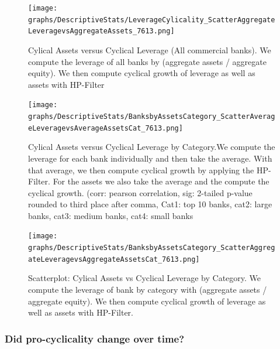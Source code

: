 \documentclass[12pt, a4paper]{article} %
\begin{document}
\begin{figure}[H]
\begin{minipage}{\textwidth}
\centering
\texttt{[image: graphs/DescriptiveStats/LeverageCylicality\_ScatterAggregateLeveragevsAggregateAssets\_7613.png]}
\label{fig:ScatterCyclicalAggregateLeverageAssets}
\caption[1]{Cylical Assets versus Cyclical Leverage (All commercial banks). We compute the leverage of all banks by (aggregate assets / aggregate equity). We then compute cyclical growth of leverage as well as assets with HP-Filter}
\end{minipage}
\end{figure}


\begin{figure}[H]
\begin{minipage}{\textwidth}
\texttt{[image: graphs/DescriptiveStats/BanksbyAssetsCategory\_ScatterAverageLeveragevsAverageAssetsCat\_7613.png]}
\caption[1]{Cylical Assets versus Cyclical Leverage by Category.We compute the leverage for each bank individually and then take the average. With that average, we then compute cyclical growth by applying the HP-Filter. For the assets we also take the average and the compute the cyclical growth. (corr: pearson correlation, sig: 2-tailed p-value rounded to third place after comma, Cat1: top 10 banks, cat2: large banks, cat3: medium banks, cat4: small banks}
\label{fig:ScatterAverageCyclicalLeverageAssetsbyCat}
\end{minipage}
\end{figure}

\begin{figure}[H]
\begin{minipage}{\textwidth}
\texttt{[image: graphs/DescriptiveStats/BanksbyAssetsCategory\_ScatterAggregateLeveragevsAggregateAssetsCat\_7613.png]}
\caption[1]{Scatterplot: Cylical Assets vs Cyclical Leverage by Category. We compute the leverage of bank by category with (aggregate assets / aggregate equity). We then compute cyclical growth of leverage as well as assets with HP-Filter.}
\label{fig:ScatterAggregateCyclicalLeverageAssetsbyCat}
\end{minipage}
\end{figure}

\subsubsection{Did pro-cyclicality change over time?}
\end{document}
